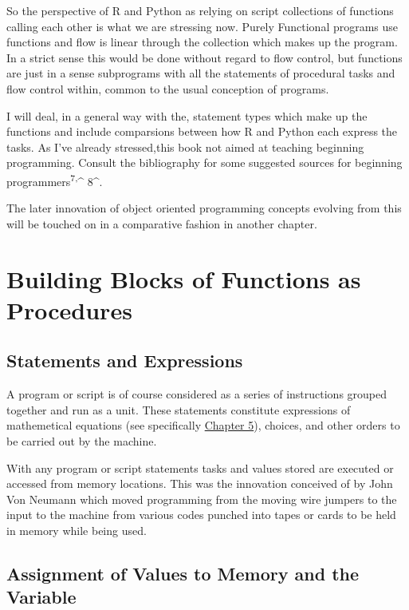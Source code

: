 \documentclass[]{book}
\theoremstyle{definition}
\theoremstyle{definition}
\theoremstyle{definition}
\theoremstyle{remark}
\begin{document}
So the perspective of R and Python as relying on script collections of
functions calling each other is what we are stressing now. Purely
Functional programs use functions and flow is linear through the
collection which makes up the program. In a strict sense this would be
done without regard to flow control, but functions are just in a sense
subprograms with all the statements of procedural tasks and flow control
within, common to the usual conception of programs.

I will deal, in a general way with the, statement types which make up
the functions and include comparsions between how R and Python each
express the tasks. As I've already stressed,this book not aimed at
teaching beginning programming. Consult the bibliography for some
suggested sources for beginning programmers\textsuperscript{7,}\^{}
8\^{}.  

The later innovation of object oriented programming concepts evolving
from this will be touched on in a comparative fashion in another
chapter.

\section{Building Blocks of Functions as
Procedures}\label{building-blocks-of-functions-as-procedures}

\subsection{\texorpdfstring{Statements and Expressions
}{Statements and Expressions  }}\label{statements-and-expressions}

A program or script is of course considered as a series of instructions
grouped together and run as a unit. These statements constitute
expressions of mathemetical equations (see specifically \href{}{Chapter
5}), choices, and other orders to be carried out by the machine.

With any program or script statements tasks and values stored are
executed or accessed from memory locations. This was the innovation
conceived of by John Von Neumann which moved programming from the moving
wire jumpers to the input to the machine from various codes punched into
tapes or cards to be held in memory while being used.

\subsection{\texorpdfstring{Assignment of Values to Memory and the
Variable
}{Assignment of Values to Memory and the Variable }}\label{assignment-of-values-to-memory-and-the-variable}
\end{document}
